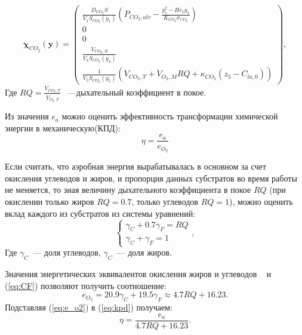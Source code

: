 \begin{equation} \label{co2sourceLa}
\mathbf{\chi}_{CO_{2}}(\mathbf{y})=\begin{pmatrix}
\displaystyle \frac{D_{CO_{2}}S}{V_{1}S_{CO_{2}}(y_{1})}\left(P_{CO_{2},alv}-\frac{y_{1}^2-Hc_{1}y_{1}}{K_{CO_{2}} \sigma_{CO_{2}}} \right) \\
0 \\
0 \\
\displaystyle \frac{\dot{V}_{CO_{2},B}}{V_{4}S_{CO_{2}}(y_{4})} \\
\displaystyle \frac{1}{V_{5}S_{CO_{2}}(y_{5})}\left(\dot{V}_{CO_{2},T}+\dot{V}_{O_{2},M}RQ+\kappa_{CO_{2}}\left(z_{5}-C_{la,0}\right) \right)
\end{pmatrix},
\end{equation}
Где $\displaystyle RQ=\frac{\dot{V}_{CO_{2},T}}{\dot{V}_{O_{2},T}}$  ~---дыхательный коэффициент в покое.

Из значения \(e_{a}\) можно оценить эффективность трансформации химической энергии в механическую(КПД):
\begin{equation}\label{eq:kpd}
\eta =\frac{e_{a}}{e_{O_{2}}}
\end{equation}

Если считать, что аэробная энергия вырабатывалась в основном за счет окисления углеводов и жиров, и пропорция данных субстратов во время работы не меняется, то зная величину дыхательного коэффициента в покое \(RQ\) (при окислении только жиров \(RQ=0.7\), только углеводов \(RQ=1\)), можно оценить вклад каждого из субстратов из системы уравнений:
\begin{equation}  \label{eq:CF}
\begin{cases}
\gamma_{C}+0.7\gamma_{F} = RQ  \\
\gamma_{C}+\gamma_{F} = 1
\end{cases},
\end{equation}
Где \(\gamma_{C}\)~--- доля углеводов, \(\gamma_{C}\)~--- доля жиров.

Значения энергетических эквивалентов окисления жиров и углеводов ~\cite{maughan1997} и (\ref{eq:CF}) позволяют получить соотношение:
\begin{equation} \label{eq:e_o2}
e_{O_{2}}=20.9\gamma_{C}+19.5\gamma_{F} \approx 4.7 RQ + 16.23.
\end{equation}
Подставляя (\ref{eq:e_o2}) в (\ref{eq:kpd}) получаем:
\begin{equation}
\eta =\frac{e_{a}}{4.7 RQ + 16.23}.
\end{equation}


